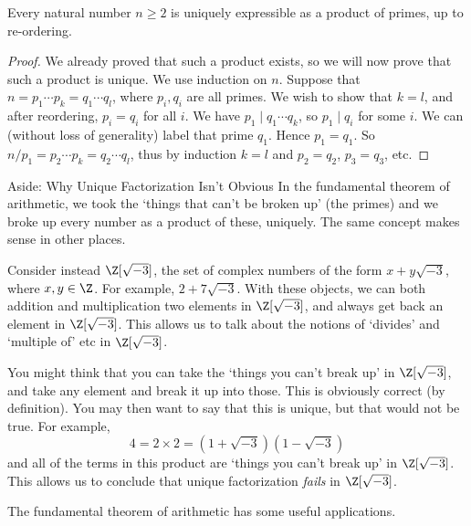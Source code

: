 \begin{theorem}
	Every natural number $n \geq 2$ is uniquely expressible as a product of primes, up to re-ordering.
\end{theorem}
\begin{proof}
	We already proved that such a product exists, so we will now prove that such a product is unique. We use induction on $n$.
	Suppose that $n = p_1 \cdots p_k = q_1 \cdots q_l$, where $p_i, q_i$ are all primes. We wish to show that $k = l$, and after reordering, $p_i = q_i$ for all $i$. We have $p_1 \mid q_1 \cdots q_k$, so $p_1 \mid q_i$ for some $i$. We can (without loss of generality) label that prime $q_1$. Hence $p_1 = q_1$. So $n/p_1 = p_2 \cdots p_k = q_2 \cdots q_l$, thus by induction $k = l$ and $p_2 = q_2$, $p_3 = q_3$, etc.
\end{proof}

\begin{aside}{Aside: Why Unique Factorization Isn't Obvious}
	In the fundamental theorem of arithmetic, we took the `things that can't be broken up' (the primes) and we broke up every number as a product of these, uniquely. The same concept makes sense in other places.

Consider instead $\Z[\sqrt{-3}]$, the set of complex numbers of the form $x + y\sqrt{-3}$, where $x, y \in \Z$. For example, $2 + 7\sqrt{-3}$. With these objects, we can both addition and multiplication two elements in $\Z[\sqrt{-3}]$, and always get back an element in $\Z[\sqrt{-3}]$. This allows us to talk about the notions of `divides' and `multiple of' etc in $\Z[\sqrt{-3}]$. 

You might think that you can take the `things you can't break up' in $\Z[\sqrt{-3}]$, and take any element and break it up into those. This is obviously correct (by definition). You may then want to say 
that this is unique, but that would not be true. For example,
$$
4 = 2 \times 2 = (1 + \sqrt{-3})(1 - \sqrt{-3})
$$
and all of the terms in this product are `things you can't break up' in $\Z[\sqrt{-3}]$. This allows us to conclude that unique factorization \emph{fails} in $\Z[\sqrt{-3}]$.

\end{aside}

The fundamental theorem of arithmetic has some useful applications.

